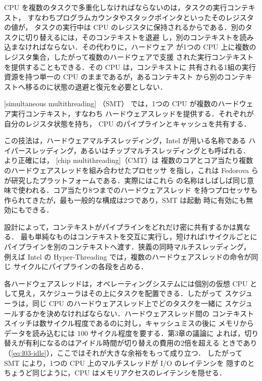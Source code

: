 \documentclass[../main.tex]{subfiles}
\begin{document}
CPU を複数のタスクで多重化しなければならないのは，タスクの実行コンテキスト，
すなわちプログラムカウンタやスタックポインタといったそのレジスタの値が，
タスクの実行中は CPU のレジスタに保持されるからである．別のタスクに切り替えるには，そのコンテキストを退避
し，別のコンテキストを読み込まなければならない．その代わりに，ハードウェア
が1つの CPU 上に複数のレジスタ集合，したがって複数のハードウェアで支援
された実行コンテキストを提供することもできる．その CPU は，コンテキストに
共有される1組の実行資源を持つ単一の CPU のままであるが，あるコンテキスト
から別のコンテキストへ移るのに状態の退避と復元を必要としない．

\begin{definition}[同時マルチスレッディング]
  [simultaneous multithreading]%
  （SMT）
  では，1つの CPU が複数のハードウェア実行コンテキスト，すなわち
  ハードウェアスレッドを提供する．それぞれが自分のレジスタ状態を持ち，
  CPU のパイプラインとキャッシュを共有する．
\end{definition}

この技法は，ハードウェアマルチスレッディング，Intel が用いる名称である
ハイパースレッディング，あるいはチップマルチスレッディングとも呼ばれる．
より正確には，%
[chip multithreading]（CMT）は
複数のコアとコア当たり複数のハードウェアスレッドを組み合わせたプロセッサ
を指し，これは Fedorova らが研究したプラットフォームである．実際にはこれら
の名称はしばしば同じ意味で使われる．コア当たり8つまでのハードウェアスレッド
を持つプロセッサも作られてきたが，最も一般的な構成は2つであり，SMT は起動
時に有効にも無効にもできる．

設計によって，コンテキストがパイプラインをどれだけ密に共有するかは異なる．
最も単純なものはコンテキストを交互に実行し，短ければ1サイクルごとに
パイプラインを別のコンテキストへ渡す．狭義の同時マルチスレッディング，
例えば Intel の Hyper-Threading では，複数のハードウェアスレッドの命令が同じ
サイクルにパイプラインの各段を占める．

各ハードウェアスレッドは，オペレーティングシステムには個別の仮想 CPU と
して見え，スケジューラはその上にタスクを配置できる．したがって
スケジューラは，同じ CPU のハードウェアスレッド上でどのタスクを一緒に
スケジュールするかを決めなければならない．ハードウェアスレッド間の
コンテキストスイッチは数サイクル程度であるのに対し，キャッシュミスの後に
メモリからデータを読み込むには 100 サイクル程度を要する．第3章の議論に
よれば，切り替えが有利になるのはアイドル時間が切り替えの費用の2倍を超える
ときであり（\cref{eq:l03-idle}），ここではそれが大きな余裕をもって成り立つ．
したがって SMT により，1つの CPU 上のマルチスレッドが I/O のレイテンシを
隠すのとちょうど同じように，CPU はメモリアクセスのレイテンシを隠せる．
\end{document}
